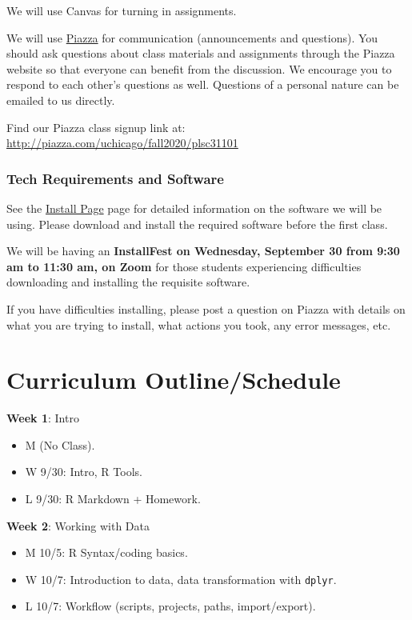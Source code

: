 \documentclass[
]{book}
\providecommand{\tightlist}{%
  \setlength{\itemsep}{0pt}\setlength{\parskip}{0pt}}
\begin{document}
We will use Canvas for turning in assignments.

We will use \href{piazza.com/uchicago/fall2020/plsc31101/home}{Piazza} for communication (announcements and questions). You should ask questions about class materials and assignments through the Piazza website so that everyone can benefit from the discussion. We encourage you to respond to each other's questions as well. Questions of a personal nature can be emailed to us directly.

Find our Piazza class signup link at: \url{http://piazza.com/uchicago/fall2020/plsc31101}

\hypertarget{tech-requirements-and-software}{%
\subsubsection*{Tech Requirements and Software}\label{tech-requirements-and-software}}

See the \href{installation}{Install Page} page for detailed information on the software we will be using. Please download and install the required software before the first class.

We will be having an \textbf{InstallFest on Wednesday, September 30 from 9:30 am to 11:30 am, on Zoom} for those students experiencing difficulties downloading and installing the requisite software.

If you have difficulties installing, please post a question on Piazza with details on what you are trying to install, what actions you took, any error messages, etc.

\hypertarget{curriculum-outlineschedule}{%
\section{Curriculum Outline/Schedule}\label{curriculum-outlineschedule}}

\textbf{Week 1}: Intro

\begin{itemize}
\tightlist
\item
  M (No Class).
\item
  W 9/30: Intro, R Tools.
\item
  L 9/30: R Markdown + Homework.
\end{itemize}

\textbf{Week 2}: Working with Data

\begin{itemize}
\tightlist
\item
  M 10/5: R Syntax/coding basics.
\item
  W 10/7: Introduction to data, data transformation with \texttt{dplyr}.
\item
  L 10/7: Workflow (scripts, projects, paths, import/export).
\end{itemize}
\end{document}

